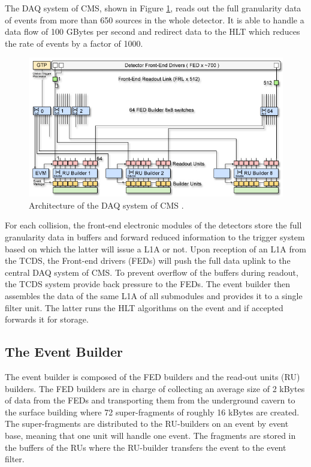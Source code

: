     The DAQ system of CMS, shown in Figure \ref{fig:I-3-daq}, reads out the full granularity data of events from more than 650 sources in the whole detector. It is able to handle a data flow of 100 GBytes per second and redirect data to the HLT which reduces the rate of events by a factor of 1000. \\

      \begin{figure}[h!]
        \centering
        \includegraphics[width=\textwidth]{img/I-3-cms/daq.jpg}
        \caption{Architecture of the DAQ system of CMS \cite{1748-0221-3-08-S08004}.}
        \label{fig:I-3-daq}
      \end{figure}

    For each collision, the front-end electronic modules of the detectors store the full granularity data in buffers and forward reduced information to the trigger system based on which the latter will issue a L1A or not. Upon reception of an L1A from the TCDS, the Front-end drivers (FEDs) will push the full data uplink to the central DAQ system of CMS. To prevent overflow of the buffers during readout, the TCDS system provide back pressure to the FEDs. The event builder then assembles the data of the same L1A of all submodules and provides it to a single filter unit. The latter runs the HLT algorithms on the event and if accepted forwards it for storage.

    \subsection{The Event Builder}

      The event builder is composed of the FED builders and the read-out units (RU) builders. The FED builders are in charge of collecting an average size of 2 kBytes of data from the FEDs and transporting them from the underground cavern to the surface building where 72 super-fragments of roughly 16 kBytes are created. The super-fragments are distributed to the RU-builders on an event by event base, meaning that one unit will handle one event. The fragments are stored in the buffers of the RUs where the RU-builder transfers the event to the event filter.

